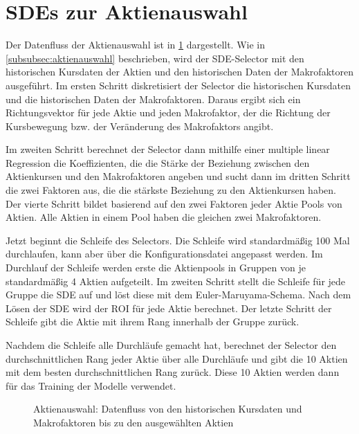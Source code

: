 \section{SDEs zur Aktienauswahl}\label{sec:sdes_zur_aktienauswahl}
Der Datenfluss der Aktienauswahl ist in \cref{fig:sde_aktienauswahl} dargestellt. Wie in \cref{subsubsec:aktienauswahl} beschrieben, wird der SDE-Selector mit den historischen Kursdaten der Aktien und den historischen Daten der Makrofaktoren ausgeführt. Im ersten Schritt diskretisiert der Selector die historischen Kursdaten und die historischen Daten der Makrofaktoren. Daraus ergibt sich ein Richtungsvektor für jede Aktie und jeden Makrofaktor, der die Richtung der Kursbewegung bzw. der Veränderung des Makrofaktors angibt.

Im zweiten Schritt berechnet der Selector dann mithilfe einer multiple linear Regression die Koeffizienten, die die Stärke der Beziehung zwischen den Aktienkursen und den Makrofaktoren angeben und sucht dann im dritten Schritt die zwei Faktoren aus, die die stärkste Beziehung zu den Aktienkursen haben. Der vierte Schritt bildet basierend auf den zwei Faktoren jeder Aktie Pools von Aktien. Alle Aktien in einem Pool haben die gleichen zwei Makrofaktoren.

Jetzt beginnt die Schleife des Selectors. Die Schleife wird standardmäßig 100 Mal durchlaufen, kann aber über die Konfigurationsdatei angepasst werden. Im Durchlauf der Schleife werden erste die Aktienpools in Gruppen von je standardmäßig 4 Aktien aufgeteilt. Im zweiten Schritt stellt die Schleife für jede Gruppe die SDE auf und löst diese mit dem Euler-Maruyama-Schema. Nach dem Lösen der SDE wird der \ac{ROI} für jede Aktie berechnet. Der letzte Schritt der Schleife gibt die Aktie mit ihrem Rang innerhalb der Gruppe zurück.

Nachdem die Schleife alle Durchläufe gemacht hat, berechnet der Selector den durchschnittlichen Rang jeder Aktie über alle Durchläufe und gibt die 10 Aktien mit dem besten durchschnittlichen Rang zurück. Diese 10 Aktien werden dann für das Training der Modelle verwendet.
\begin{figure}[htbp]
    \centering
    
    \caption{Aktienauswahl: Datenfluss von den historischen Kursdaten und Makrofaktoren bis zu den ausgewählten Aktien}
    \label{fig:sde_aktienauswahl}
\end{figure}

